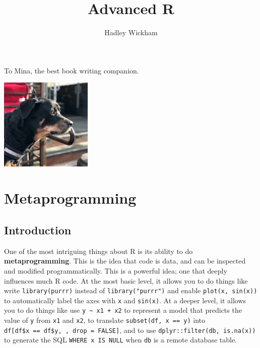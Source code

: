 \documentclass[]{book}
\title{Advanced R}
\author{Hadley Wickham}
\date{}
\begin{document}
\maketitle


\thispagestyle{empty}

\begin{center}
To Mina, the best book writing companion.

\includegraphics[width=0.33\textwidth]{mina.jpg}

\end{center}

\setlength{\abovedisplayskip}{-5pt}
\setlength{\abovedisplayshortskip}{-5pt}

{
\setcounter{tocdepth}{1}
\tableofcontents
}
\hypertarget{part-metaprogramming}{%
\part{Metaprogramming}\label{part-metaprogramming}}

\hypertarget{introduction}{%
\chapter*{Introduction}\label{introduction}}


One of the most intriguing things about R is its ability to do \textbf{metaprogramming}. This is the idea that code is data, and can be inspected and modified programmatically. This is a powerful idea; one that deeply influences much R code. At the most basic level, it allows you to do things like write \texttt{library(purrr)} instead of \texttt{library("purrr")} and enable \texttt{plot(x,\ sin(x))} to automatically label the axes with \texttt{x} and \texttt{sin(x)}. At a deeper level, it allows you to do things like use \texttt{y\ \textasciitilde{}\ x1\ +\ x2} to represent a model that predicts the value of \texttt{y} from \texttt{x1} and \texttt{x2}, to translate \texttt{subset(df,\ x\ ==\ y)} into \texttt{df{[}df\$x\ ==\ df\$y,\ ,\ drop\ =\ FALSE{]}}, and to use \texttt{dplyr::filter(db,\ is.na(x))} to generate the SQL \texttt{WHERE\ x\ IS\ NULL} when \texttt{db} is a remote database table.
\end{document}
